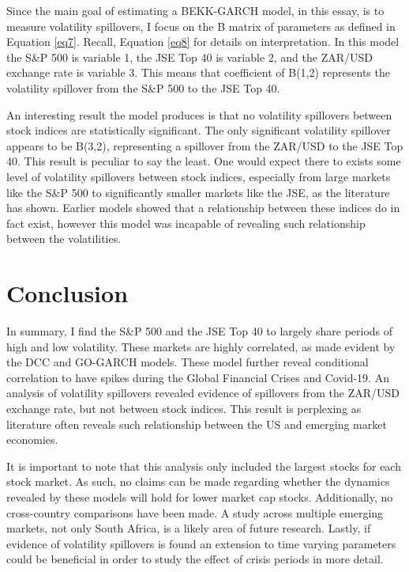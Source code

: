 \documentclass[11pt,preprint, authoryear]{elsarticle}
\numberwithin{equation}{section}
\numberwithin{figure}{section}
\numberwithin{table}{section}
\begin{document}
Since the main goal of estimating a BEKK-GARCH model, in this essay, is
to measure volatility spillovers, I focus on the B matrix of parameters
as defined in Equation \ref{eq7}. Recall, Equation \ref{eq8} for details
on interpretation. In this model the S\&P 500 is variable 1, the JSE Top
40 is variable 2, and the ZAR/USD exchange rate is variable 3. This
means that coefficient of B(1,2) represents the volatility spillover
from the S\&P 500 to the JSE Top 40.

An interesting result the model produces is that no volatility
spillovers between stock indices are statistically significant. The only
significant volatility spillover appears to be B(3,2), representing a
spillover from the ZAR/USD to the JSE Top 40. This result is peculiar to
say the least. One would expect there to exists some level of volatility
spillovers between stock indices, especially from large markets like the
S\&P 500 to significantly smaller markets like the JSE, as the
literature has shown. Earlier models showed that a relationship between
these indices do in fact exist, however this model was incapable of
revealing such relationship between the volatilities.

\hypertarget{conclusion}{%
\section{Conclusion}\label{conclusion}}

In summary, I find the S\&P 500 and the JSE Top 40 to largely share
periods of high and low volatility. These markets are highly correlated,
as made evident by the DCC and GO-GARCH models. These model further
reveal conditional correlation to have spikes during the Global
Financial Crises and Covid-19. An analysis of volatility spillovers
revealed evidence of spillovers from the ZAR/USD exchange rate, but not
between stock indices. This result is perplexing as literature often
reveals such relationship between the US and emerging market economies.

It is important to note that this analysis only included the largest
stocks for each stock market. As such, no claims can be made regarding
whether the dynamics revealed by these models will hold for lower market
cap stocks. Additionally, no cross-country comparisons have been made. A
study across multiple emerging markets, not only South Africa, is a
likely area of future research. Lastly, if evidence of volatility
spillovers is found an extension to time varying parameters could be
beneficial in order to study the effect of crisis periods in more
detail.
\end{document}

